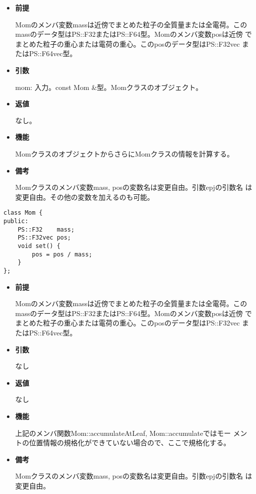 \begin{itemize}

\item {\bf 前提}

  Momのメンバ変数massは近傍でまとめた粒子の全質量または全電荷。この
  massのデータ型はPS::F32またはPS::F64型。Momのメンバ変数posは近傍
  でまとめた粒子の重心または電荷の重心。このposのデータ型はPS::F32vec
  またはPS::F64vec型。

\item {\bf 引数}

  mom: 入力。const Mom \&型。Momクラスのオブジェクト。
  
\item {\bf 返値}

  なし。

\item {\bf 機能}

  MomクラスのオブジェクトからさらにMomクラスの情報を計算する。
  
\item {\bf 備考}

  Momクラスのメンバ変数mass, posの変数名は変更自由。引数epjの引数名
  は変更自由。その他の変数を加えるのも可能。

\end{itemize}


\begin{screen}
\begin{verbatim}
class Mom {
public:
    PS::F32    mass;
    PS::F32vec pos;
    void set() {
        pos = pos / mass;
    }
};
\end{verbatim}
\end{screen}

\begin{itemize}

\item {\bf 前提}

  Momのメンバ変数massは近傍でまとめた粒子の全質量または全電荷。この
  massのデータ型はPS::F32またはPS::F64型。Momのメンバ変数posは近傍
  でまとめた粒子の重心または電荷の重心。このposのデータ型はPS::F32vec
  またはPS::F64vec型。

\item {\bf 引数}

  なし
  
\item {\bf 返値}

  なし

\item {\bf 機能}

  上記のメンバ関数Mom::accumulateAtLeaf, Mom::accumulateではモー
  メントの位置情報の規格化ができていない場合ので、ここで規格化する。
  
\item {\bf 備考}

  Momクラスのメンバ変数mass, posの変数名は変更自由。引数epjの引数名
  は変更自由。

\end{itemize}

